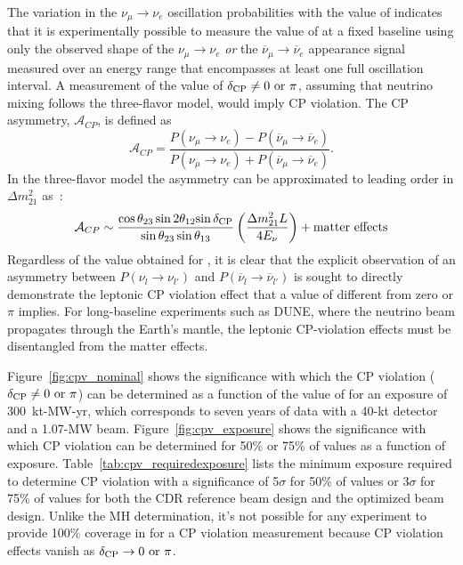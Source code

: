 The variation in the $\nu_\mu \rightarrow
\nu_e$ oscillation probabilities with the value of \deltacp
indicates that it is experimentally possible to measure the value of
\deltacp at a fixed baseline using only the observed shape of the
$\nu_\mu \rightarrow \nu_e$ {\em or} the 
$\overline{\nu}_\mu \rightarrow \overline{\nu}_e$
appearance signal measured over an energy range that encompasses at
least one full oscillation interval. A measurement of the value of
$\mdeltacp \neq 0 \ {\rm or} \ \pi$, assuming that neutrino mixing follows the three-flavor model, would imply CP violation.  
The CP asymmetry,
$\mathcal{A}_{CP}$, is defined as 
\begin{equation}
\label{eqn:cp-asymm}
 \mathcal{A}_{CP} = \frac{P(\nu_\mu \rightarrow \nu_e) -
  P(\overline{\nu}_\mu \rightarrow \overline{\nu}_e)}{P(\nu_\mu \rightarrow
  \nu_e) + P(\overline{\nu}_\mu \rightarrow \overline{\nu}_e)}.
\end{equation}
In the three-flavor model the asymmetry can be approximated to leading
order in $\Delta m_{21}^2$ as~\cite{Marciano:2006uc}:
\begin{equation}
\mathcal{A}_{CP} \sim \frac{\cos \theta_{23} \sin 2 \theta_{12}
  {\sin \mdeltacp}}{\sin \theta_{23} \sin \theta_{13}}
\left(\frac{\Delta m^2_{21} L}{ 4 E_{\nu}}\right) + {\rm matter
  \ effects}
\label{eqn:cpasym}
\end{equation}
Regardless of the 
value obtained for \deltacp, it is clear that the explicit observation
of an asymmetry between $P(\nu_l \rightarrow \nu_{l'})$ and
$P(\overline{\nu}_l \rightarrow \overline{\nu}_{l'})$ 
is sought to directly demonstrate the
leptonic CP violation effect that a value of \deltacp different 
from zero or $\pi$ implies.
For long-baseline experiments such as DUNE, where the neutrino beam propagates through 
the Earth's mantle, the leptonic CP-violation effects must be disentangled from 
the matter effects.

Figure~\ref{fig:cpv_nominal} shows the significance with which the CP violation ($\mdeltacp \neq 0 \ {\rm or} \ \pi$) can be determined as a function of the value of \deltacp for an exposure of 300~kt-MW-yr, which corresponds to seven years of data with a 40-kt detector and a 1.07-MW beam.  Figure~\ref{fig:cpv_exposure} shows the significance with which CP violation can be determined for 50\% or 75\% of \deltacp values as a function of exposure.  Table~\ref{tab:cpv_requiredexposure} lists the minimum exposure required to determine CP violation with a significance of 5$\sigma$ for 50\% of \deltacp values or 3$\sigma$ for 75\% of \deltacp values for both the CDR reference beam design and the optimized beam design.  Unlike the MH determination, it's not possible for any experiment to provide 100\% coverage in \deltacp for a CP violation measurement because CP violation effects vanish as $\mdeltacp \rightarrow 0 {\rm~or~} \pi$.

